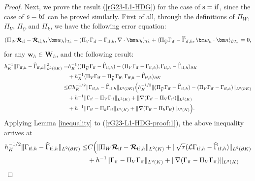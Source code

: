 \documentclass[1996/10/24]{amsart}
\theoremstyle{definition}
\numberwithin{equation}{section}
\begin{document}
\begin{proof}
Next, we prove the result (\ref{rG23-L1-HDG}) for the case of ${\rm s=if}$, since the case of ${\rm s=bf}$ can be proved similarly.
First of all, through the definitions of $\Pi_W$, $\Pi_V$, $\Pi_{\widehat{V}}$ and $\Pi_k$, we have the following error equation:
\begin{align}
(\Pi_W\boldsymbol{\mathcal{R}}_{{\rm if}}-\boldsymbol{\mathcal{R}}_{{\rm if},h},{\bm w}_h)_{\mathcal{T}_h}-
(\Pi_V\Gamma_{{\rm if}}-\Gamma_{{\rm if},h},\nabla\cdot{\bm w}_h)_{\mathcal{T}_h}+\langle\Pi_{\widehat{V}}\Gamma_{{\rm if}}-\widehat{\Gamma}_{{\rm if},h},{\bm w}_h\cdot{\bm n}\rangle_{\partial\mathcal{T}_h}=0,\label{rG23-L1-HDG-proof:1}
\end{align}
for any ${\bm w}_h\in {\bm W}_h$, and the following result:
\begin{align*}
h^{-1}_K\|\Gamma_{{\rm if},h}-\widehat{\Gamma}_{{\rm if},h}\|^2_{L^2(\partial K)}=&h_K^{-1}\langle(\Pi_{\widehat{V}}\Gamma_{{\rm if}}-\widehat{\Gamma}_{{\rm if},h})-(\Pi_V\Gamma_{{\rm if}}-\Gamma_{{\rm if},h}),\Gamma_{{\rm if},h}-\widehat{\Gamma}_{{\rm if},h}\rangle_{\partial K}\\
&+h_K^{-1}\langle\Pi_V\Gamma_{{\rm if}}-\Pi_{\widehat{V}}\Gamma_{{\rm if}},\Gamma_{{\rm if},h}-\widehat{\Gamma}_{{\rm if},h}\rangle_{\partial K}\\
\leq&Ch_K^{-1/2}\|\Gamma_{{\rm if},h}-\widehat{\Gamma}_{{\rm if},h}\|_{L^2(\partial K)}\Big(h_K^{-1/2}\|(\Pi_{\widehat{V}}\Gamma_{{\rm if}}-\widehat{\Gamma}_{{\rm if},h})-(\Pi_V\Gamma_{{\rm if}}-\Gamma_{{\rm if},h})\|_{L^2(\partial K)}\\
&+h^{-1}\|\Gamma_{{\rm if}}-\Pi_V\Gamma_{{\rm if}}\|_{L^2(K)}+\|\nabla(\Gamma_{{\rm if}}-\Pi_V\Gamma_{{\rm if}})\|_{L^2(K)}\\
&+h^{-1}\|\Gamma_{{\rm if}}-\Pi_k\Gamma_{{\rm if}}\|_{L^2(K)}+\|\nabla(\Gamma_{{\rm if}}-\Pi_k\Gamma_{{\rm if}})\|_{L^2(K)}\Big).
\end{align*}
Applying Lemma \ref{inequality} to (\ref{rG23-L1-HDG-proof:1}), the above inequality arrives at
\begin{align}
h^{-1/2}_K\|\Gamma_{{\rm if},h}-\widehat{\Gamma}_{{\rm if},h}\|_{L^2(\partial K)}\leq& C\Big(\|\Pi_W\boldsymbol{\mathcal{R}}_{{\rm if}}-\boldsymbol{\mathcal{R}}_{{\rm if},h}\|_{L^2(K)}+\|\sqrt{\tau}(\mathcal{L}\Gamma_{{\rm if},h}-\widehat{\Gamma}_{{\rm if},h})\|_{L^2(\partial K)}\nonumber\\
&+h^{-1}\|\Gamma_{{\rm if}}-\Pi_V\Gamma_{{\rm if}}\|_{L^2(K)}+\|\nabla(\Gamma_{{\rm if}}-\Pi_V\Gamma_{{\rm if}})\|_{L^2(K)}\label{rG23-L1-HDG-proof:2}\\

\end{align}
\end{proof}
\end{document}
